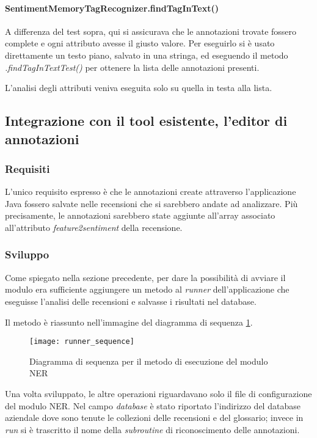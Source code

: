 \paragraph{SentimentMemoryTagRecognizer.findTagInText()}
A differenza del test sopra, qui si assicurava che le annotazioni trovate
fossero complete e ogni attributo avesse il giusto valore. Per eseguirlo si è
usato direttamente un testo piano, salvato in una stringa, ed eseguendo il
metodo \textit{.findTagInTextTest()} per ottenere la lista delle annotazioni
presenti.

L'analisi degli attributi veniva eseguita solo su quella in testa alla lista.

\subsection{Integrazione con il tool esistente, l'editor di annotazioni}
\subsubsection{Requisiti}
L'unico requisito espresso è che le annotazioni create attraverso l'applicazione
Java fossero salvate nelle recensioni che si sarebbero andate ad analizzare.
Più precisamente, le annotazioni sarebbero state aggiunte all'array associato
all'attributo \textit{feature2sentiment} della recensione.

\subsubsection{Sviluppo}
Come spiegato nella sezione precedente, per dare la possibilità di avviare il
modulo era sufficiente aggiungere un metodo al \textit{runner} dell'applicazione
che eseguisse l'analisi delle recensioni e salvasse i risultati nel database.

Il metodo è riassunto nell'immagine del diagramma di sequenza
\ref{fig:runner_sequence}.

\begin{figure}[t]
\begin{center}
\texttt{[image: runner\_sequence]}
\caption{
Diagramma di sequenza per il metodo di esecuzione del modulo NER
}
\label{fig:runner_sequence}
\end{center}
\end{figure}

Una volta sviluppato, le altre operazioni riguardavano solo il file di
configurazione del modulo \gls{NER}. Nel campo \textit{database} è stato
riportato l'indirizzo del database aziendale dove sono tenute le collezioni
delle recensioni e del glossario; invece in \textit{run} si è trascritto il nome
della \textit{subroutine} di riconoscimento delle annotazioni.

